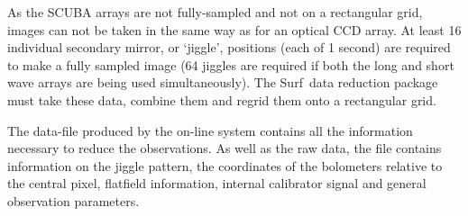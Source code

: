 \documentclass[twoside,11pt]{article}
\newcommand{\scusoft}          {{\sc Surf}}
\renewcommand{\_}{\texttt{\symbol{95}}}
\begin{document}
As the SCUBA arrays are not fully-sampled and not on a rectangular grid, images
can not be taken in the same way as for an optical CCD array. At least 16
individual secondary mirror, or `jiggle', positions (each of 1 second) are
required to make a fully sampled image (64 jiggles are required if both the
long and short wave arrays are being used simultaneously). The \scusoft\ data
reduction package must take these data, combine them and regrid them onto a
rectangular grid.

The data-file produced by the on-line system contains all the information
necessary to reduce the observations. As well as the raw data, the file
contains information on the jiggle pattern, the coordinates of the
bolometers relative to the central pixel, flatfield information, internal
calibrator signal and general observation parameters.
\end{document}
